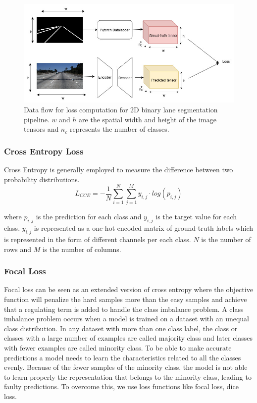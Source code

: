                  \begin{figure}[h]
    \centering
    \includegraphics[width=13cm]{images/2d_dataflow_loss_computation.jpg}
    \caption{Data flow for loss computation for 2D binary lane segmentation pipeline. $w$ and $h$ are the spatial width and height of the image tensors and $n_{c}$ represents the number of classes.}
    \end{figure}
        
        \subsubsection{Cross Entropy Loss}
        Cross Entropy is generally employed to measure the difference between two probability distributions.
        \begin{equation}
        L_{CCE} = -\frac{1}{N}\sum_{i=1}^{N} \sum^{M}_{j=1}y_{i,j}\cdot log(p_{i,j})
        \end{equation}
        
        where $p_{i,j}$ is the prediction for each class and $y_{i,j}$ is the target value for each class. $y_{i,j}$ is represented as a one-hot encoded matrix of ground-truth labels which is represented in the form of different channels per each class. $N$ is the number of rows and $M$ is the number of columns.
       
        \subsubsection{Focal Loss}
        Focal loss can be seen as an extended version of cross entropy where the objective function will penalize the hard samples more than the easy samples and achieve that a regulating term is added to handle the class imbalance problem. A class imbalance problem occurs when a model is trained on a dataset with an unequal class distribution. In any dataset with more than one class label, the class or classes with a large number of examples are called majority class and later classes with fewer examples are called minority class. To be able to make accurate predictions a model needs to learn the characteristics related to all the classes evenly. Because of the fewer samples of the minority class, the model is not able to learn properly the representation that belongs to the minority class, leading to faulty predictions. To overcome this, we use loss functions like focal loss, dice loss. 
        
